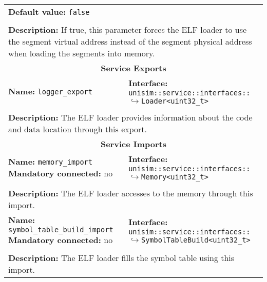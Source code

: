 \begin{center}
\begin{tabular}{|p{7.5cm}|p{7.5cm}|}
		\multicolumn{2}{|p{15cm}|}{\textbf{Default value:} \texttt{false}}\\
		\multicolumn{2}{|l|}{}\\
		\multicolumn{2}{|p{15cm}|}{\textbf{Description:} \newline If true, this parameter forces the ELF loader to use the segment virtual address instead of the segment physical address when loading the segments into memory.}\\
		\hline
		\hline
		\multicolumn{2}{|c|}{\textbf{\large Service Exports}}\\
		\hline
		\multicolumn{1}{|p{7.5cm}}{\textbf{Name:} \texttt{logger\_export}} & \multicolumn{1}{p{7.5cm}|}{\textbf{Interface:} \newline \texttt{unisim::service::interfaces::} \newline$\hookrightarrow$\texttt{Loader<uint32\_t>}}\\
		\multicolumn{2}{|l|}{}\\
		\multicolumn{2}{|p{15cm}|}{\textbf{Description:} \newline The ELF loader provides information about the code and data location through this export.}\\
		\hline
		\hline
		\multicolumn{2}{|c|}{\textbf{\large Service Imports}}\\
		\hline
		\multicolumn{1}{|p{7.5cm}}{\textbf{Name:} \texttt{memory\_import} \newline \textbf{Mandatory connected:} no} & \multicolumn{1}{p{7.5cm}|}{\textbf{Interface:} \newline \texttt{unisim::service::interfaces::} \newline$\hookrightarrow$\texttt{Memory<uint32\_t>}}\\
		\multicolumn{2}{|l|}{}\\
		\multicolumn{2}{|p{15cm}|}{\textbf{Description:} \newline The ELF loader accesses to the memory through this import.}\\
		\hline
		\multicolumn{1}{|p{7.5cm}}{\textbf{Name:} \texttt{symbol\_table\_build\_import} \newline \textbf{Mandatory connected:} no} & \multicolumn{1}{p{7.5cm}|}{\textbf{Interface:} \newline \texttt{unisim::service::interfaces::} \newline$\hookrightarrow$\texttt{SymbolTableBuild<uint32\_t>}}\\
		\multicolumn{2}{|l|}{}\\
		\multicolumn{2}{|p{15cm}|}{\textbf{Description:} \newline The ELF loader fills the symbol table using this import.}\\
		\hline
	\end{tabular}
\end{center}

